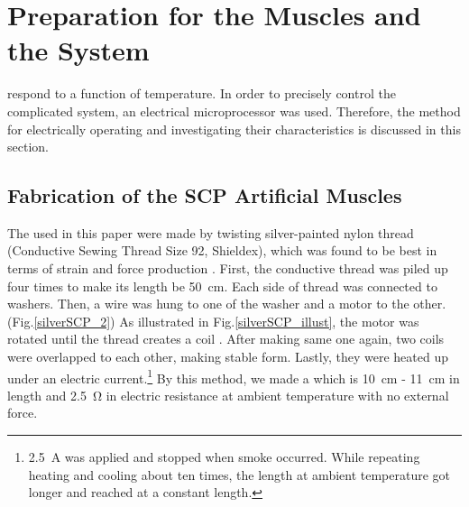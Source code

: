 \section{Preparation for the Muscles and the System}\label{section_preparation}
\scps respond to a function of temperature. In order to precisely control the complicated system, an electrical microprocessor was used. Therefore, the method for electrically operating \scps and investigating their characteristics is discussed in this section. 

\subsection{Fabrication of the SCP Artificial Muscles}
The \scps used in this paper were made by twisting silver-painted nylon thread (Conductive Sewing Thread Size 92, Shieldex), which was found to be best in terms of strain and force production \cite{haines}. First, the conductive thread was piled up four times to make its length be \SI{50}{\centi\meter}. Each side of thread was connected to washers. Then, a wire was hung to one of the washer and a motor to the other. (Fig.\ref{silverSCP_2})
As illustrated in Fig.\ref{silverSCP_illust}, the motor was rotated until the thread creates a coil \cite{fab_coil}. After making same one again, two coils were overlapped to each other, making stable form. 
Lastly, they were heated up under an electric current.\footnote{\SI{2.5}{\ampere} was applied and stopped when smoke occurred. While repeating heating and cooling about ten times, the length at ambient temperature got longer and reached at a constant length.} By this method, we made a \scp which is \SI{10}{\centi\meter} - \SI{11}{\centi\meter} in length and \SI{2.5}{\ohm} in electric resistance at ambient temperature with no external force.

